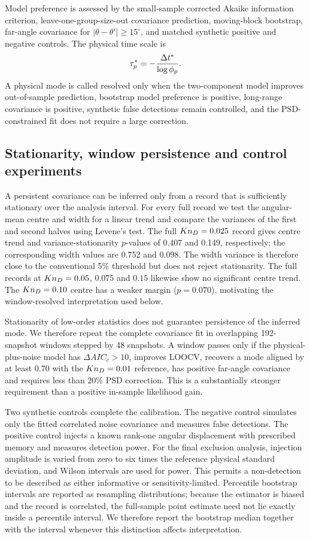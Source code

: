 Model preference is assessed by the small-sample corrected Akaike information criterion, leave-one-group-size-out covariance prediction, moving-block bootstrap, far-angle covariance for $|\theta-\theta'|\geq15^\circ$, and matched synthetic positive and negative controls. The physical time scale is
\begin{equation}
 \tau_p^*=-\frac{\Delta t^*}{\log \phi_p}.
\end{equation}
A physical mode is called resolved only when the two-component model improves out-of-sample prediction, bootstrap model preference is positive, long-range covariance is positive, synthetic false detections remain controlled, and the PSD-constrained fit does not require a large correction.

\subsection{Stationarity, window persistence and control experiments}
A persistent covariance can be inferred only from a record that is sufficiently stationary over the analysis interval. For every full record we test the angular-mean centre and width for a linear trend and compare the variances of the first and second halves using Levene's test. The full $Kn_D=0.025$ record gives centre trend and variance-stationarity $p$-values of 0.407 and 0.149, respectively; the corresponding width values are 0.752 and 0.098. The width variance is therefore close to the conventional 5\% threshold but does not reject stationarity. The full records at $Kn_D=0.05$, $0.075$ and $0.15$ likewise show no significant centre trend. The $Kn_D=0.10$ centre has a weaker margin ($p=0.070$), motivating the window-resolved interpretation used below.

Stationarity of low-order statistics does not guarantee persistence of the inferred mode. We therefore repeat the complete covariance fit in overlapping 192-snapshot windows stepped by 48 snapshots. A window passes only if the physical-plus-noise model has $\Delta AIC_c>10$, improves LOOCV, recovers a mode aligned by at least 0.70 with the $Kn_D=0.01$ reference, has positive far-angle covariance and requires less than 20\% PSD correction. This is a substantially stronger requirement than a positive in-sample likelihood gain.

Two synthetic controls complete the calibration. The negative control simulates only the fitted correlated noise covariance and measures false detections. The positive control injects a known rank-one angular displacement with prescribed memory and measures detection power. For the final exclusion analysis, injection amplitude is varied from zero to six times the reference physical standard deviation, and Wilson intervals are used for power. This permits a non-detection to be described as either informative or sensitivity-limited. Percentile bootstrap intervals are reported as resampling distributions; because the estimator is biased and the record is correlated, the full-sample point estimate need not lie exactly inside a percentile interval. We therefore report the bootstrap median together with the interval whenever this distinction affects interpretation.

